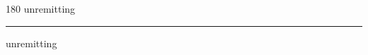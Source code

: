 
\begin{frame}
\begin{center}
\begin{turn}{180}
{\fontsize{2.5cm}{1em}\selectfont unremitting}
\end{turn}
\vspace{1em}\par  
\hrule
\vspace{1em}\par  
{\fontsize{2.5cm}{1em}\selectfont unremitting}
\end{center}
\end{frame}
